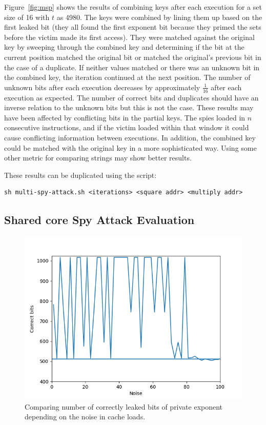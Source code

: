 \documentclass[12pt]{article}
\begin{document}
Figure~\ref{fig:msp} shows the results of combining keys after each execution for a set size of 16 with $t$ as 4980. 
The keys were combined by lining them up based on the first leaked bit (they all found the first exponent bit because they primed the sets before the victim made its first access). 
They were matched against the original key by sweeping through the combined key and determining if the bit at the current position matched the original bit or matched the original's previous bit in the case of a duplicate.
If neither values matched or there was an unknown bit in the combined key, the iteration continued at the next position.
The number of unknown bits after each execution decreases by approximately $\frac{1}{16}$ after each execution as expected.
The number of correct bits and duplicates should have an inverse relation to the unknown bits but this is not the case.
These results may have been affected by conflicting bits in the partial keys.
The spies loaded in $n$ consecutive instructions, and if the victim loaded within that window it could cause conflicting information between executions.
In addition, the combined key could be matched with the original key in a more sophisticated way.
Using some other metric for comparing strings may show better results.

These results can be duplicated using the script:
\begin{verbatim}
sh multi-spy-attack.sh <iterations> <square addr> <multiply addr> 
\end{verbatim}

\subsection{Shared core Spy Attack Evaluation}

\begin{figure}[h]
    \centering
    \includegraphics[scale=0.7]{../presentation/shared_experiments.png}
    \caption{Comparing number of correctly leaked bits of private exponent depending on the noise in cache loads.}
    \label{fig:ssp}
\end{figure}
\end{document}
